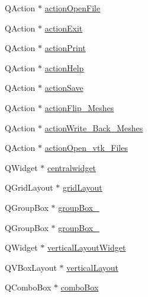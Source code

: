 \begin{DoxyCompactItemize}
\item 
Q\-Action $\ast$ \hyperlink{class_ui___shape_population_viewer_a58f4923d6705e47a569ccdaa1ba950ce}{action\-Open\-File}
\item 
Q\-Action $\ast$ \hyperlink{class_ui___shape_population_viewer_ace554b35188e2266e75d55577875b171}{action\-Exit}
\item 
Q\-Action $\ast$ \hyperlink{class_ui___shape_population_viewer_a9ac409dda64e917fe1488ee100820b80}{action\-Print}
\item 
Q\-Action $\ast$ \hyperlink{class_ui___shape_population_viewer_a92290dc77004bc9ef295bce741137e7b}{action\-Help}
\item 
Q\-Action $\ast$ \hyperlink{class_ui___shape_population_viewer_a5528a51653195ff23ff1c8f0b07f3a71}{action\-Save}
\item 
Q\-Action $\ast$ \hyperlink{class_ui___shape_population_viewer_a71a8abf27a03d8433b69f26859b37fbd}{action\-Flip\-\_\-\-Meshes}
\item 
Q\-Action $\ast$ \hyperlink{class_ui___shape_population_viewer_ab48a26c5d53762d6669813fe1f6ccfaf}{action\-Write\-\_\-\-Back\-\_\-\-Meshes}
\item 
Q\-Action $\ast$ \hyperlink{class_ui___shape_population_viewer_a3fed0dc43d988ee2f0a88bd5f41e2f8d}{action\-Open\-\_\-vtk\-\_\-\-Files}
\item 
Q\-Widget $\ast$ \hyperlink{class_ui___shape_population_viewer_aeb8fec16684660d1702cf2d4f1d12f2f}{centralwidget}
\item 
Q\-Grid\-Layout $\ast$ \hyperlink{class_ui___shape_population_viewer_af3bc5541822e536de7b4a80d50d90195}{grid\-Layout}
\item 
Q\-Group\-Box $\ast$ \hyperlink{class_ui___shape_population_viewer_af5e228584a01908bc1c03518e524637c}{group\-Box\-\_}
\item 
Q\-Group\-Box $\ast$ \hyperlink{class_ui___shape_population_viewer_ad16b63d2018a2ebb705ff5be049f1f8e}{group\-Box\-\_}
\item 
Q\-Widget $\ast$ \hyperlink{class_ui___shape_population_viewer_a550f85a97f1beedbb4ed26ff2ad1143b}{vertical\-Layout\-Widget}
\item 
Q\-V\-Box\-Layout $\ast$ \hyperlink{class_ui___shape_population_viewer_a6d6c91184d20792aeb28b7b5044f0abf}{vertical\-Layout}
\item 
Q\-Combo\-Box $\ast$ \hyperlink{class_ui___shape_population_viewer_a64011f16a878e4138f972f03100bd8e5}{combo\-Box}
\item 

\end{DoxyCompactItemize}
